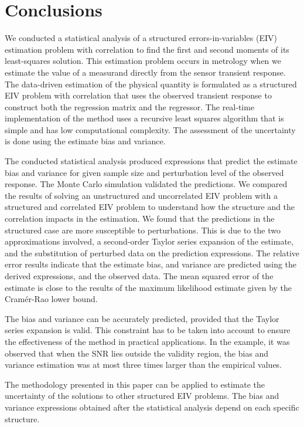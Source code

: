 \section{Conclusions}

 We conducted a statistical analysis of a structured errors-in-variables (EIV) estimation problem with correlation to find the first and second moments of its least-squares solution.
This estimation problem occurs in metrology when we estimate the value of a measurand directly from the sensor transient response.
The data-driven estimation of the physical quantity is formulated as a structured EIV problem with correlation that uses the observed transient response to construct both the regression matrix and the regressor.
The real-time implementation of the method uses a recursive least squares algorithm that is simple and has low computational complexity.
The assessment of the uncertainty is done using the estimate bias and variance.

The conducted statistical analysis produced expressions that predict the estimate bias and variance for given sample size and perturbation level of the observed response.
The Monte Carlo simulation validated the predictions.
We compared the results of solving an unstructured and uncorrelated EIV problem with a structured and correlated EIV problem to understand how the structure and the correlation impacts in the estimation.
We found that the predictions in the structured case are more susceptible to perturbations.
This is due to the two approximations involved, a second-order Taylor series expansion of the estimate, and the substitution of perturbed data on the prediction expressions.
The relative error results indicate that the estimate bias, and variance are predicted using the derived expressions, and the observed data.
The mean squared error of the estimate is close to the results of the maximum likelihood estimate given by the Cram\'er-Rao lower bound.

The bias and variance can be accurately predicted, provided that the Taylor series expansion is valid.
This constraint has to be taken into account to ensure the effectiveness of the method in practical applications.
In the example, it was observed that when the SNR lies outside the validity region, the bias and variance estimation was at most three times larger than the empirical values.

The methodology presented in this paper can be applied to estimate the uncertainty of the solutions to other structured EIV problems.
The bias and variance expressions obtained after the statistical analysis depend on each specific structure.



